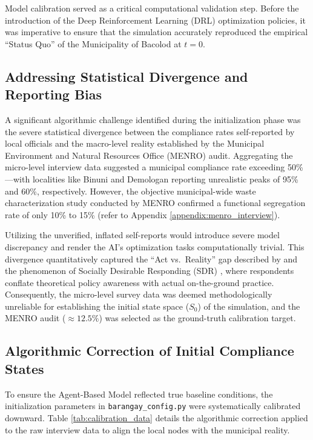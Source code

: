 Model calibration served as a critical computational validation step. Before the introduction of the Deep Reinforcement Learning (DRL) optimization policies, it was imperative to ensure that the simulation accurately reproduced the empirical ``Status Quo'' of the Municipality of Bacolod at $t=0$. 

\subsection{Addressing Statistical Divergence and Reporting Bias}
A significant algorithmic challenge identified during the initialization phase was the severe statistical divergence between the compliance rates self-reported by local officials and the macro-level reality established by the Municipal Environment and Natural Resources Office (MENRO) audit. Aggregating the micro-level interview data suggested a municipal compliance rate exceeding 50\%—with localities like Binuni and Demologan reporting unrealistic peaks of 95\% and 60\%, respectively. However, the objective municipal-wide waste characterization study conducted by MENRO confirmed a functional segregation rate of only 10\% to 15\% (refer to Appendix \ref{appendix:menro_interview}).

Utilizing the unverified, inflated self-reports would introduce severe model discrepancy and render the AI's optimization tasks computationally trivial. This divergence quantitatively captured the ``Act vs.\ Reality'' gap described by \cite{Yazawa2025} and the phenomenon of Socially Desirable Responding (SDR) \citep{Geiger2021}, where respondents conflate theoretical policy awareness with actual on-the-ground practice. Consequently, the micro-level survey data was deemed methodologically unreliable for establishing the initial state space ($S_0$) of the simulation, and the MENRO audit ($\approx 12.5\%$) was selected as the ground-truth calibration target.

\subsection{Algorithmic Correction of Initial Compliance States}
To ensure the Agent-Based Model reflected true baseline conditions, the initialization parameters in \texttt{barangay\_config.py} were systematically calibrated downward. Table \ref{tab:calibration_data} details the algorithmic correction applied to the raw interview data to align the local nodes with the municipal reality.

